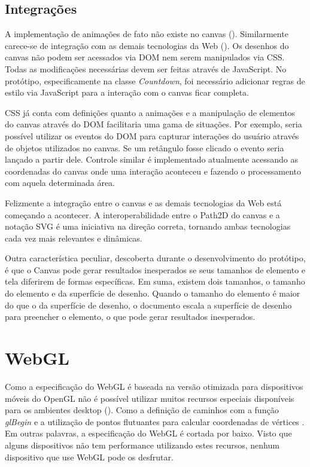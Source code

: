 \subsection{Integrações}

A implementação de animações de fato não existe no canvas
(). Similarmente carece-se de integração
com as demais tecnologias da Web ().
Os desenhos do canvas não podem ser acessados via DOM nem serem
manipulados via CSS. Todas as modificações necessárias devem ser
feitas através de JavaScript. No protótipo, especificamente na classe
\textit{Countdown}, foi necessário adicionar regras de estilo via
JavaScript para a interação com o canvas ficar completa.

CSS já conta com definições quanto a animações e a manipulação de
elementos do canvas através do DOM facilitaria uma gama de situações.
Por exemplo, seria possível utilizar os eventos do DOM para capturar
interações do usuário através de objetos utilizados no canvas.
Se um retângulo fosse clicado o evento seria lançado a partir dele.
Controle similar é implementado atualmente acessando as coordenadas
do canvas onde uma interação aconteceu e fazendo o processamento com
aquela determinada área.

Felizmente a integração entre o canvas e as demais tecnologias da
Web está começando a acontecer. A interoperabilidade entre o Path2D
do canvas e a notação SVG é uma iniciativa na direção correta,
tornando ambas tecnologias cada vez mais relevantes e dinâmicas.

Outra característica peculiar, descoberta durante o desenvolvimento
do protótipo, é que o Canvas pode gerar resultados inesperados se
seus tamanhos de elemento e tela diferirem de formas específicas. Em
suma, existem dois tamanhos, o tamanho do elemento e da superfície de
desenho. Quando o tamanho do elemento é maior do que o da superfície
de desenho, o documento escala a superfície de desenho para preencher o
elemento, o que pode gerar resultados inesperados.

\section{WebGL}

Como a especificação do WebGL é baseada na versão otimizada
para dispositivos móveis do OpenGL não é possível utilizar
muitos recursos especiais disponíveis para os ambientes desktop
(). Como a definição de caminhos
com a função \textit{glBegin} e a utilização de pontos flutuantes
para calcular coordenadas de vértices \textsc{\autocite{esVsGl}}. Em outras
palavras, a especificação do WebGL é cortada por baixo. Visto que
alguns dispositivos não tem performance utilizando estes recursos,
nenhum dispositivo que use WebGL pode os desfrutar.

